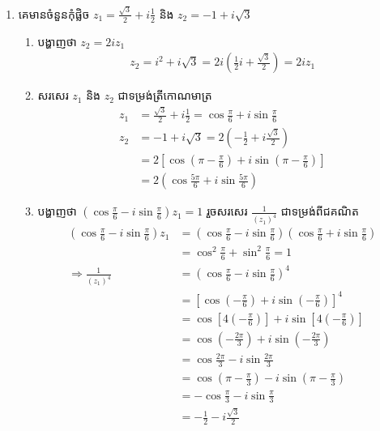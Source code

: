 \documentclass[11pt,a4paper]{myclass}
\begin{document}
	\begin{enumerate}
		\item គេមានចំនួនកុំផ្លិច $ z_1=\frac{\sqrt{3}}{2}+i\frac{1}{2} $ និង $ z_2=-1+i\sqrt{3} $
		\begin{enumerate}
			\item បង្ហាញថា $ z_2=2iz_1 $
			\begin{align*}
			z_2=i^2+i\sqrt{3}=2i\left( \frac{1}{2}i+\frac{\sqrt{3}}{2} \right)=2iz_1
			\end{align*}
			\item សរសេរ $ z_1 $ និង $ z_2 $ ជាទម្រង់ត្រីកោណមាត្រ
			\begin{align*}
			z_1 &=\frac{\sqrt{3}}{2}+i\frac{1}{2}=\cos \frac{\pi}{6}+i\sin\frac{\pi}{6}\\
			z_2 &=-1+i\sqrt{3}=2\left( -\frac{1}{2}+i\frac{\sqrt{3}}{2} \right)\\
			&=2\left[\cos\left( \pi-\frac{\pi}{6} \right)+i\sin\left( \pi-\frac{\pi}{6} \right) \right]\\
			&=2\left( \cos \frac{5\pi}{6}+i\sin\frac{5\pi}{6} \right)
			\end{align*}
			\item បង្ហាញថា $ \left(\cos\frac{\pi}{6}-i\sin\frac{\pi}{6}\right)z_1=1 $ រួចសរសេរ $ \frac{1}{(z_1)^4} $ ជាទម្រង់ពីជគណិត
			\begin{align*}
			\left( \cos\frac{\pi}{6}-i\sin\frac{\pi}{6} \right)z_1
			&=\left( \cos\frac{\pi}{6}-i\sin\frac{\pi}{6} \right)\left( \cos\frac{\pi}{6}+i\sin\frac{\pi}{6} \right)\\
			&=\cos^2\frac{\pi}{6}+\sin^2\frac{\pi}{6}=1\\
			\Rightarrow
			\frac{1}{(z_1)^4} &=\left( \cos\frac{\pi}{6}-i\sin\frac{\pi}{6} \right)^4\\
			&=\left[ \cos\left( -\frac{\pi}{6} \right)+i\sin\left( -\frac{\pi}{6} \right) \right]^4\\
			&=\cos\left[ 4\left( -\frac{\pi}{6} \right) \right]+i\sin\left[ 4\left( -\frac{\pi}{6} \right) \right]\\
			&=\cos\left( -\frac{2\pi}{3} \right)+i\sin\left( -\frac{2\pi}{3} \right)\\
			&=\cos\frac{2\pi}{3}-i\sin\frac{2\pi}{3}\\
			&=\cos\left( \pi-\frac{\pi}{3} \right)-i\sin\left( \pi-\frac{\pi}{3} \right)\\
			&=-\cos\frac{\pi}{3}-i\sin\frac{\pi}{3}\\
			&=-\frac{1}{2}-i\frac{\sqrt{3}}{2}
			\end{align*}
		\end{enumerate}

\end{enumerate}
\end{document}
